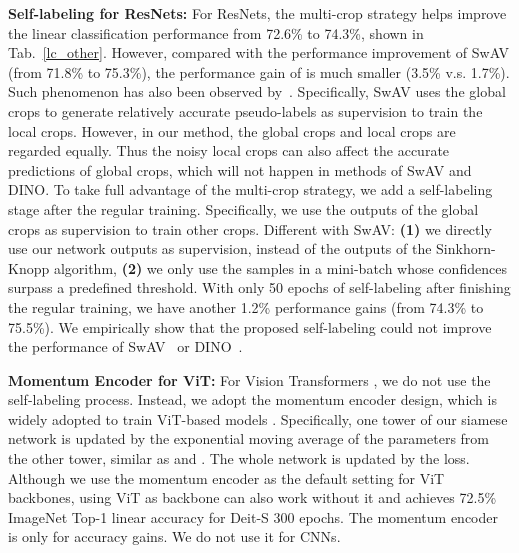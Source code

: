 \documentclass[10pt,twocolumn,letterpaper]{article}
\begin{document}
\textbf{Self-labeling for ResNets:} For ResNets, the multi-crop strategy helps improve the linear classification performance from 72.6\% to 74.3\%, shown in Tab.~\ref{lc_other}. However, compared with the performance improvement of SwAV (from 71.8\% to 75.3\%), the performance gain of \ourmethod is much smaller (3.5\% v.s. 1.7\%). Such phenomenon has also been observed by~\cite{caron2021emerging}. 
Specifically, SwAV uses the global crops to generate relatively accurate pseudo-labels as supervision to train the local crops. However, in our method, the global crops and local crops are regarded equally. Thus the noisy local crops can also affect the accurate predictions of global crops, which will not happen in methods of SwAV and DINO. To take full advantage of the multi-crop strategy, we add a self-labeling stage after the regular training. Specifically, we use the outputs of the global crops as supervision to train other crops. Different with SwAV: \textbf{(1)} we directly use our network outputs as supervision, instead of the outputs of the Sinkhorn-Knopp algorithm, \textbf{(2)} we only use the samples in a mini-batch whose confidences surpass a predefined threshold. With only 50 epochs of self-labeling after finishing the regular training, we have another 1.2\% performance gains (from 74.3\% to 75.5\%). We empirically show that the proposed self-labeling could not improve the performance of SwAV~\cite{caron2020unsupervised} or DINO~\cite{caron2021emerging}. 

\textbf{Momentum Encoder for ViT:} For Vision Transformers \cite{dosovitskiy2020image,touvron2021training}, we do not use the self-labeling process. Instead, we adopt the momentum encoder design, which is widely adopted to train ViT-based models \cite{caron2021emerging, chen2021empirical}. Specifically, one tower of our siamese network is updated by the exponential moving average of the parameters from the other tower, similar as \cite{he2020momentum} and \cite{grill2020bootstrap}. The whole network is updated by the \ourmethod loss. Although we use the momentum encoder as the default setting for ViT backbones, \ourmethod using ViT as backbone can also work without it and achieves 72.5\% ImageNet Top-1 linear accuracy for Deit-S 300 epochs. 
The momentum encoder is only for accuracy gains. We do not use it for CNNs.

\newcommand{\cmark}{\ding{51}}
\newcommand{\xmark}{\ding{55}}
\end{document}
